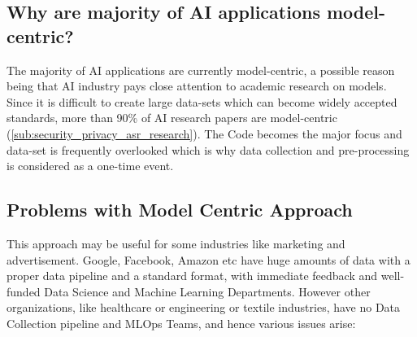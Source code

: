 \subsection{Why are majority of AI applications model-centric?}
The majority of AI applications are currently model-centric, a possible reason being that AI industry pays close attention to academic research on models. Since it is difficult to create large data-sets which can become widely accepted standards, more than 90\% of AI research papers are model-centric \cite{deeplearningai_data-centric_2021} (\ref{sub:security_privacy_asr_research}). The Code becomes the major focus and data-set is frequently overlooked which is why data collection and pre-processing is considered as a one-time event.

\subsection{Problems with Model Centric Approach}
This approach may be useful for some industries like marketing and advertisement. Google, Facebook, Amazon etc have huge amounts of data with a proper data pipeline and a standard format, with immediate feedback and well-funded Data Science and Machine Learning Departments. However other organizations, like healthcare or engineering or textile industries, have no Data Collection pipeline and MLOps Teams, and hence various issues arise:
